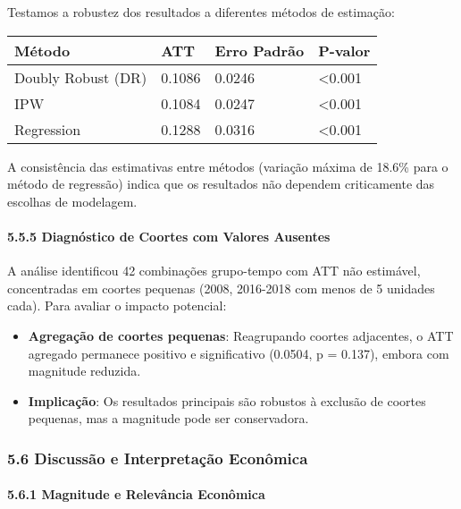 \documentclass[
  brazilian,
  12pt,
  a4paper,
]{article}
\providecommand{\tightlist}{%
  \setlength{\itemsep}{0pt}\setlength{\parskip}{0pt}}
\begin{document}
Testamos a robustez dos resultados a diferentes métodos de estimação:

\begin{longtable}[]{@{}llll@{}}
\toprule\noalign{}
Método & ATT & Erro Padrão & P-valor \\
\midrule\noalign{}
\endhead
\bottomrule\noalign{}
\endlastfoot
Doubly Robust (DR) & 0.1086 & 0.0246 & \textless0.001 \\
IPW & 0.1084 & 0.0247 & \textless0.001 \\
Regression & 0.1288 & 0.0316 & \textless0.001 \\
\end{longtable}

A consistência das estimativas entre métodos (variação máxima de 18.6\%
para o método de regressão) indica que os resultados não dependem
criticamente das escolhas de modelagem.

\paragraph{\texorpdfstring{\textbf{5.5.5 Diagnóstico de Coortes com
Valores
Ausentes}}{5.5.5 Diagnóstico de Coortes com Valores Ausentes}}\label{diagnuxf3stico-de-coortes-com-valores-ausentes}

A análise identificou 42 combinações grupo-tempo com ATT não estimável,
concentradas em coortes pequenas (2008, 2016-2018 com menos de 5
unidades cada). Para avaliar o impacto potencial:

\begin{itemize}
\tightlist
\item
  \textbf{Agregação de coortes pequenas}: Reagrupando coortes
  adjacentes, o ATT agregado permanece positivo e significativo (0.0504,
  p = 0.137), embora com magnitude reduzida.
\item
  \textbf{Implicação}: Os resultados principais são robustos à exclusão
  de coortes pequenas, mas a magnitude pode ser conservadora.
\end{itemize}

\subsubsection{\texorpdfstring{\textbf{5.6 Discussão e Interpretação
Econômica}}{5.6 Discussão e Interpretação Econômica}}\label{discussuxe3o-e-interpretauxe7uxe3o-econuxf4mica}

\paragraph{\texorpdfstring{\textbf{5.6.1 Magnitude e Relevância
Econômica}}{5.6.1 Magnitude e Relevância Econômica}}\label{magnitude-e-relevuxe2ncia-econuxf4mica}
\end{document}
